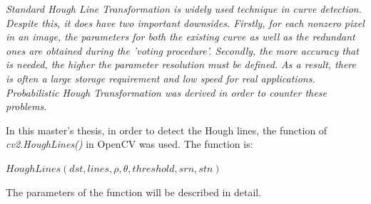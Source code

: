 \emph{\color{green}Standard Hough Line Transformation is widely used technique in curve detection. Despite this, it does have two important downsides. Firstly, for each nonzero pixel in an image, the parameters for both the existing curve as well as the redundant ones are obtained during the 'voting procedure'. Secondly, the more accuracy that is needed, the higher the parameter resolution must be defined. As a result, there is often a large storage requirement and low speed for real applications. Probabilistic Hough Transformation was derived in order to counter these problems. }

In this master's thesis, in order to detect the Hough lines, the function of \textit{cv2.HoughLines()} in OpenCV was used. The function is:

  \begin{center}
  
$HoughLines(dst, lines, \rho, \theta, threshold, srn, stn )  $

  \end{center}

The parameters of the function will be described in detail.\cite{Standard_Hough_Transformation2}
 

